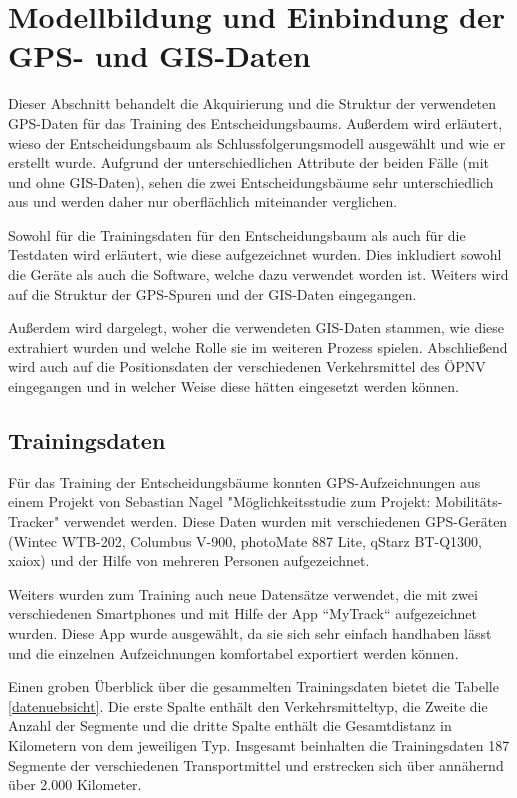 \chapter{Modellbildung und Einbindung der GPS- und GIS-Daten}
Dieser Abschnitt behandelt die Akquirierung und die Struktur der verwendeten GPS-Daten für das Training des Entscheidungsbaums. Außerdem wird erläutert, wieso der Entscheidungsbaum als Schlussfolgerungsmodell ausgewählt und wie er erstellt wurde. Aufgrund der unterschiedlichen Attribute  der beiden Fälle (mit und ohne GIS-Daten), sehen die zwei Entscheidungsbäume sehr unterschiedlich aus und werden daher nur oberflächlich miteinander verglichen.

Sowohl für die Trainingsdaten für den Entscheidungsbaum als auch für die Testdaten wird erläutert, wie diese aufgezeichnet wurden. Dies inkludiert sowohl die Geräte als auch die Software, welche dazu verwendet worden ist. Weiters wird auf die Struktur der GPS-Spuren und der GIS-Daten eingegangen.

Außerdem wird dargelegt, woher die verwendeten GIS-Daten stammen, wie diese extrahiert wurden und welche Rolle sie im weiteren Prozess spielen. Abschließend wird auch auf die Positionsdaten der verschiedenen Verkehrsmittel des ÖPNV eingegangen und in welcher Weise diese hätten eingesetzt werden können.
\clearpage

\section{Trainingsdaten}
\label{sec:trainingdata}
Für das Training der Entscheidungsbäume konnten GPS-Aufzeichnungen aus einem Projekt von Sebastian Nagel "Möglichkeitsstudie zum Projekt: Mobilitäts-Tracker" verwendet werden. Diese Daten wurden mit verschiedenen GPS-Geräten (Wintec WTB-202, Columbus V-900, photoMate 887 Lite, qStarz BT-Q1300, xaiox) und der Hilfe von mehreren Personen aufgezeichnet. \cite{sebastian_nagel_moglichkeitsstudie_2011}

Weiters wurden zum Training auch neue Datensätze verwendet, die mit zwei verschiedenen Smartphones und mit Hilfe der App ``MyTrack`` aufgezeichnet wurden. Diese App wurde ausgewählt, da sie sich sehr einfach handhaben lässt und die einzelnen Aufzeichnungen komfortabel exportiert werden können. 

Einen groben Überblick über die gesammelten Trainingsdaten bietet die Tabelle \ref{datenuebsicht}. Die erste Spalte enthält den Verkehrsmitteltyp, die Zweite die Anzahl der Segmente  und die dritte Spalte enthält die Gesamtdistanz in Kilometern von dem jeweiligen Typ. Insgesamt beinhalten die Trainingsdaten 187 Segmente der verschiedenen Transportmittel und erstrecken sich über annähernd über 2.000 Kilometer.

